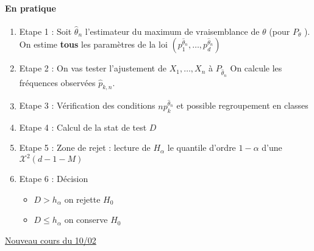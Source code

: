 \documentclass{article}
\theoremstyle{plain}%
\theoremstyle{definition}
\theoremstyle{remark}
\begin{document}
\paragraph{En pratique}
\begin{enumerate}
    \item Etape 1 : Soit $ \hat{\theta }_n $ l'estimateur du maximum de vraisemblance de $ \theta  $ (pour $ P_\theta  $ ). On estime \textbf{tous} les paramètres de la loi $ (p_1^{\hat{\theta }_n}, \dots, p_d^{\hat{\theta }_n}) $ 
    \item Etape 2 : On vas tester l'ajustement de $ X_1, \dots, X_n $ à $ P_{\hat{\theta }_n} $ On calcule les fréquences observées $ \hat{p}_{k,n} $.
    \item Etape 3 : Vérification des conditions $ np_k^{\hat{\theta }_n} $ et possible regroupement en classes 
    \item Etape 4 : Calcul de la stat de test $ D $ 
    \item Etape 5 : Zone de rejet : lecture de $ H_\alpha  $ le quantile d'ordre $ 1-\alpha  $ d'une $ \mathcal{X}^2(d-1-M) $ 
    \item Etape 6 : Décision 
        \begin{itemize}
            \item $ D > h_\alpha  $ on rejette $ H_0 $ 
            \item $ D \leq h_\alpha  $ on conserve $ H_0 $ 
        \end{itemize}
\end{enumerate}

\underline{Nouveau cours du 10/02} \\
\end{document}
